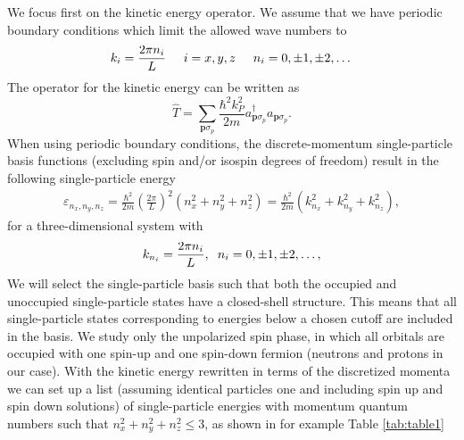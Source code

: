 \documentclass[thesis.tex]{subfiles}
\begin{document}
We focus first on the kinetic energy operator.  We assume that we have
periodic boundary conditions which limit the allowed wave numbers to
\[
k_i=\frac{2\pi n_i}{L}\hspace{0.5cm} i=x,y,z \hspace{0.5cm} n_i=0,\pm
1,\pm 2, \dots
\]
The operator for the kinetic energy can be written as
\[
\hat{T}=\sum_{\mathbf{p}\sigma_p}\frac{\hbar^2k_P^2}{2m}a_{\mathbf{p}\sigma_p}^{\dagger}a_{\mathbf{p}\sigma_p}.
\]
When using periodic boundary conditions, the discrete-momentum
single-particle basis functions (excluding spin and/or isospin degrees
of freedom) result in the following single-particle energy
\begin{align*}
  \varepsilon_{n_{x}, n_{y}, n_{z}} = \frac{\hbar^{2}}{2m} \left(
  \frac{2\pi }{L}\right)^{2} \left( n_{x}^{2} + n_{y}^{2} +
  n_{z}^{2}\right)=\frac{\hbar^2}{2m}\left(k_{n_x}^2+k_{n_y}^2+k_{n_z}^2\right),
\end{align*} 
for a three-dimensional system with
\[
k_{n_i}=\frac{2\pi n_i}{L}, \hspace{0.2cm} n_i = 0, \pm 1, \pm 2,
\dots,
\]
We will select the single-particle basis such that both the occupied
and unoccupied single-particle states have a closed-shell
structure. This means that all single-particle states corresponding to
energies below a chosen cutoff are included in the basis. We study
only the unpolarized spin phase, in which all orbitals are occupied
with one spin-up and one spin-down fermion (neutrons and protons in
our case).  With the kinetic energy rewritten in terms of the
discretized momenta we can set up a list (assuming
identical particles one and including spin up and spin down solutions)
of single-particle energies with momentum quantum numbers such that $n_{x}^{2}+n_{y}^{2}+n_{z}^{2}\le
3$, as shown in for example Table \ref{tab:table1}
\end{document}
